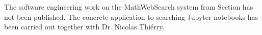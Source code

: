 The software engineering work on the MathWebSearch system from Section has not been published. The concrete application to searching Jupyter notebooks has been carried out together with Dr. Nicolas Thi\'erry.


